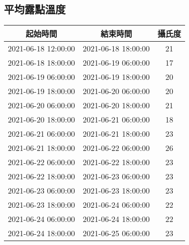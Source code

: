 \documentclass{article}%
\begin{document}
\begin{center}
\section{平均露點溫度}%
\label{sec:}%
\begin{tabular}{|c|c|c|}%
\hline%
起始時間&結束時間&攝氏度\\%
\hline%
2021{-}06{-}18 12:00:00&2021{-}06{-}18 18:00:00&21\\%
\hline%
2021{-}06{-}18 18:00:00&2021{-}06{-}19 06:00:00&17\\%
\hline%
2021{-}06{-}19 06:00:00&2021{-}06{-}19 18:00:00&20\\%
\hline%
2021{-}06{-}19 18:00:00&2021{-}06{-}20 06:00:00&20\\%
\hline%
2021{-}06{-}20 06:00:00&2021{-}06{-}20 18:00:00&21\\%
\hline%
2021{-}06{-}20 18:00:00&2021{-}06{-}21 06:00:00&18\\%
\hline%
2021{-}06{-}21 06:00:00&2021{-}06{-}21 18:00:00&23\\%
\hline%
2021{-}06{-}21 18:00:00&2021{-}06{-}22 06:00:00&26\\%
\hline%
2021{-}06{-}22 06:00:00&2021{-}06{-}22 18:00:00&23\\%
\hline%
2021{-}06{-}22 18:00:00&2021{-}06{-}23 06:00:00&23\\%
\hline%
2021{-}06{-}23 06:00:00&2021{-}06{-}23 18:00:00&23\\%
\hline%
2021{-}06{-}23 18:00:00&2021{-}06{-}24 06:00:00&22\\%
\hline%
2021{-}06{-}24 06:00:00&2021{-}06{-}24 18:00:00&22\\%
\hline%
2021{-}06{-}24 18:00:00&2021{-}06{-}25 06:00:00&23\\%
\hline%
\end{tabular}

%
\end{center}%
\end{document}
